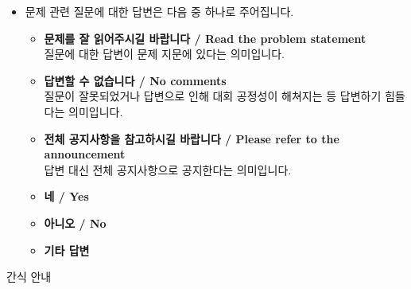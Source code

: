 \begin{itemize}[noitemsep]
    \item 문제 관련 질문에 대한 답변은 다음 중 하나로 주어집니다.
    \begin{itemize}[noitemsep]
        \item \textbf{문제를 잘 읽어주시길 바랍니다 / Read the problem statement}\\
        질문에 대한 답변이 문제 지문에 있다는 의미입니다.
        \item \textbf{답변할 수 없습니다 / No comments}\\
        질문이 잘못되었거나 답변으로 인해 대회 공정성이 해쳐지는 등 답변하기 힘들다는 의미입니다.
        \item \textbf{전체 공지사항을 참고하시길 바랍니다 / Please refer to the announcement}\\
        답변 대신 전체 공지사항으로 공지한다는 의미입니다.
        \item \textbf{네 / Yes}
        \item \textbf{아니오 / No}
        \item \textbf{기타 답변}
    \end{itemize}
\end{itemize}

{
    \indent
    \Large    
    간식 안내
}

